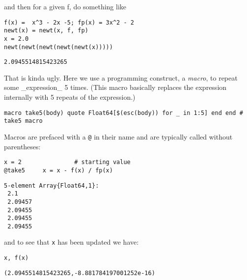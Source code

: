 \documentclass[12pt]{article}
\begin{document}
\newline
and then for a given f, do something like\begin{verbatim}
f(x) =  x^3 - 2x -5; fp(x) = 3x^2 - 2
newt(x) = newt(x, f, fp)
x = 2.0
newt(newt(newt(newt(newt(x)))))
\end{verbatim}
\begin{verbatim}
2.0945514815423265\end{verbatim}
\newline
That is kinda ugly. Here we use a programming construct, a \textit{macro}, to repeat some _expression_ 5 times. (This macro basically replaces the expression internally with 5 repeats of the expression.)\begin{verbatim}
macro take5(body) quote Float64[$(esc(body)) for _ in 1:5] end end # take5 macro
\end{verbatim}
\newline
Macros are prefaced with a \texttt{@} in their name and are typically called without parentheses:\begin{verbatim}
x = 2				# starting value
@take5     x = x - f(x) / fp(x)
\end{verbatim}
\begin{verbatim}
5-element Array{Float64,1}:
 2.1    
 2.09457
 2.09455
 2.09455
 2.09455\end{verbatim}
\newline
and to see that \texttt{x} has been updated we have:\begin{verbatim}
x, f(x)
\end{verbatim}
\begin{verbatim}
(2.0945514815423265,-8.881784197001252e-16)\end{verbatim}
\end{document}
